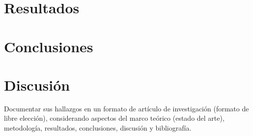 \documentclass[a4paper]{article}
\begin{document}
\section{Resultados}

\section{Conclusiones}


\section{Discusión}



Documentar sus hallazgos en un formato de artículo de investigación (formato de libre elección), considerando
aspectos del marco teórico (estado del arte), metodología, resultados, conclusiones, discusión y bibliografía.



\end{document}
